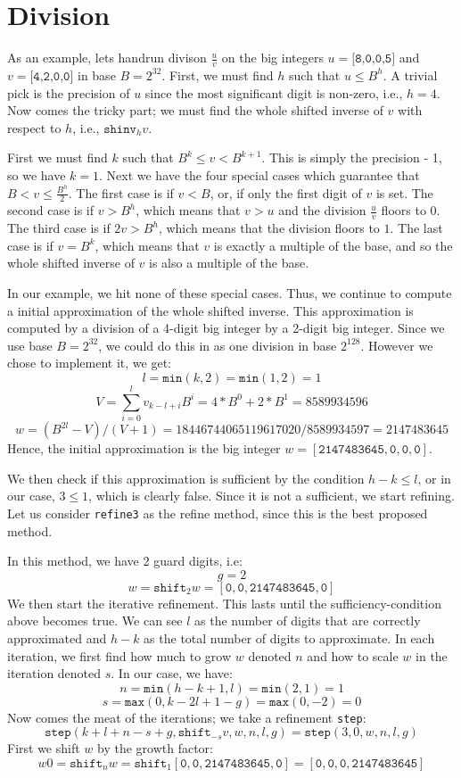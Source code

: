 \section{Division}
As an example, lets handrun divison $\frac{u}{v}$ on the big integers $u = \texttt{[8,0,0,5]}$ and $v = \texttt{[4,2,0,0]}$ in base $B=2^{32}$. First, we must find $h$ such that $u\leq B^h$. A trivial pick is the precision of $u$ since the most significant digit is non-zero, i.e., $h=4$. Now comes the tricky part; we must find the whole shifted inverse of $v$ with respect to $h$, i.e., $\mathtt{shinv}_hv$.

First we must find $k$ such that $B^k\leq v < B^{k+1}$. This is simply the precision - 1, so we have $k = 1$. Next we have the four special cases which guarantee that $B < v \leq \frac{B^h}{2}$. The first case is if $v < B$, or, if only the first digit of $v$ is set. The second case is if $v > B^h$, which means that $v>u$ and the division $\frac{u}{v}$ floors to $0$. The third case is if $2v > B^h$, which means that the division floors to $1$. The last case is if $v = B^k$, which means that $v$ is exactly a multiple of the base, and so the whole shifted inverse of $v$ is also a multiple of the base.

In our example, we hit none of these special cases. Thus, we continue to compute a initial approximation of the whole shifted inverse. This approximation is computed by a division of a 4-digit big integer by a 2-digit big integer. Since we use base $B = 2^{32}$, we could do this in as one division in base $2^{128}$. However we chose to implement it, we get:
\[l = \mathtt{min}(k,2) = \mathtt{min}(1,2) = 1\]
\[V = \sum_{i=0}^lv_{k-l+i}B^i = 4 * B^0 + 2 * B^{1} = 8589934596\]
\[w = (B^{2l}- V ) / (V + 1) = 18446744065119617020 / 8589934597 = 2147483645\]
Hence, the initial approximation is the big integer $w = \mathtt{[2147483645,0,0,0]}$.

We then check if this approximation is sufficient by the condition $h-k \leq l$, or in our case, $3 \leq 1$, which is clearly false. Since it is not a sufficient, we start refining. Let us consider \texttt{refine3} as the refine method, since this is the best proposed method.

In this method, we have 2 guard digits, i.e:
\[g = 2\]
\[w = \mathtt{shift}_2w = \mathtt{[0,0,2147483645,0]}\]
We then start the iterative refinement. This lasts until the sufficiency-condition above becomes true. We can see $l$ as the number of digits that are correctly approximated and $h - k$ as the total number of digits to approximate. In each iteration, we first find how much to grow $w$ denoted $n$ and how to scale $w$ in the iteration denoted $s$. In our case, we have:
\[n = \mathtt{min}(h-k+1, l) = \mathtt{min}(2, 1) = 1\]
\[s = \mathtt{max}(0, k - 2l + 1 - g) = \mathtt{max}(0,-2) = 0\]
Now comes the meat of the iterations; we take a refinement \texttt{step}:
\[ \mathtt{step}(k + l + n - s + g, \mathtt{shift}_{-s}v, w, n, l, g) = \mathtt{step}(3, 0, w, n, l, g)\]
First we shift $w$ by the growth factor:
\[w0 = \mathtt{shift}_nw = \mathtt{shift}_1 \mathtt{[0,0,2147483645,0]}= \mathtt{[0,0,0,2147483645]}\]

